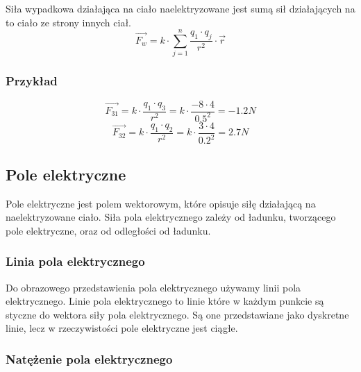 \documentclass{../notatki}
\begin{document}
Siła wypadkowa działająca na ciało naelektryzowane jest sumą sił
działających na to ciało ze strony innych ciał.
$$
\vec{F_w} = k \cdot \sum_{j=1}^{n} \frac{q_1 \cdot q_j}{r^2} \cdot \vec{r}
$$

\subsubsection{Przykład}

\begin{figure}[h]
  \centering
\end{figure}
$$
\vec{F_{31}} = k \cdot \frac{q_1 \cdot q_3}{r^2} = k \cdot \frac{-8\cdot
4}{0.5^2} = -1.2 N
$$
$$
\vec{F_{32}} = k \cdot \frac{q_1 \cdot q_2}{r^2} = k \cdot \frac{3\cdot
4}{0.2^2} = 2.7 N
$$

\subsection{Pole elektryczne}

Pole elektryczne jest polem wektorowym, które opisuje siłę działającą na
naelektryzowane ciało. Siła pola elektrycznego zależy od ładunku,
tworzącego pole elektryczne, oraz od odległości od ładunku.

\subsubsection{Linia pola elektrycznego}

Do obrazowego przedstawienia pola elektrycznego używamy linii pola
elektrycznego. Linie pola elektrycznego to linie które w każdym punkcie są
styczne do wektora siły pola elektrycznego. Są one przedstawiane jako dyskretne
linie, lecz w rzeczywistości pole elektryczne jest ciągłe.

\subsubsection{Natężenie pola elektrycznego}
\end{document}
